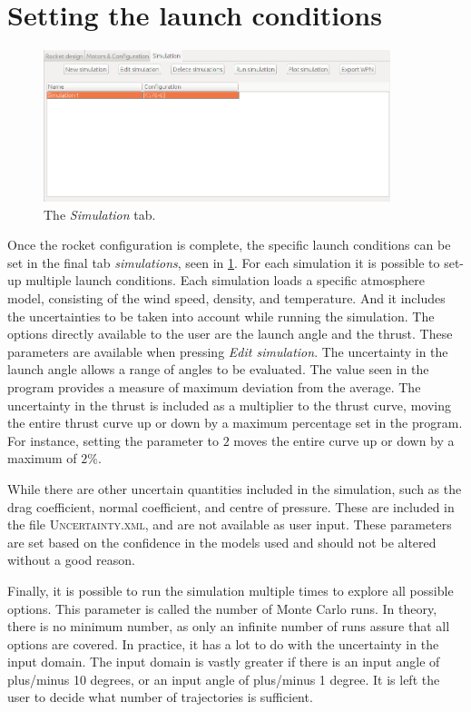\documentclass[11pt, a4paper]{article}
\newcommand{\loc}[1]{{\footnotesize \textsc{#1}}}
\begin{document}
\section{Setting the launch conditions} \label{sec:simulation}

\begin{figure}
  \centering
    \includegraphics[width=0.9\textwidth]{r-simulation.png}
  \caption{The \emph{Simulation} tab.}
  \label{fig:simulation}
\end{figure}

Once the rocket configuration is complete, the specific launch conditions can be set in the final tab \emph{simulations}, seen in \cref{fig:simulation}. For each simulation it is possible to set-up multiple launch conditions. Each simulation loads a specific atmosphere model, consisting of the wind speed, density, and temperature. And it includes the uncertainties to be taken into account while running the simulation. The options directly available to the user are the launch angle and the thrust. These parameters are available when pressing \emph{Edit simulation}.
The uncertainty in the launch angle allows a range of angles to be evaluated. The value seen in the program provides a measure of maximum deviation from the average.
The uncertainty in the thrust is included as a multiplier to the thrust curve, moving the entire thrust curve up or down by a maximum percentage set in the program. For instance, setting the parameter to $2$ moves the entire curve up or down by a maximum of $2\%$.

While there are other uncertain quantities included in the simulation, such as the drag coefficient, normal coefficient, and centre of pressure. These are included in the file \loc{Uncertainty.xml}, and are not available as user input. These parameters are set based on the confidence in the models used and should not be altered without a good reason.

Finally, it is possible to run the simulation multiple times to explore all possible options. This parameter is called the number of Monte Carlo runs. In theory, there is no minimum number, as only an infinite number of runs assure that all options are covered. In practice, it has a lot to do with the uncertainty in the input domain. The input domain is vastly greater if there is an input angle of plus/minus 10 degrees, or an input angle of plus/minus 1 degree. It is left the user to decide what number of trajectories is sufficient.
\end{document}

